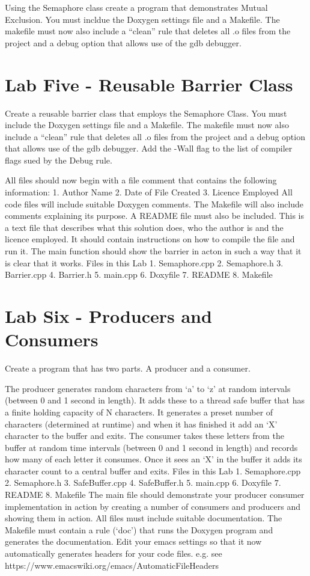 \documentclass[10pt,a4paper]{article}
\begin{document}
Using the Semaphore class create a program that demonstrates Mutual Exclusion. You must  incldue the Doxygen settings file and a Makefile.  The makefile must now also include a “clean” rule that deletes all .o files from the project and a debug option that allows use of the gdb debugger.  

 \section{Lab Five - Reusable Barrier Class}

Create a reusable barrier class that employs the Semaphore Class. You must  include the Doxygen settings file and a Makefile.
The makefile must now also include a “clean” rule that deletes all .o files from the project and a debug option that allows use of the gdb debugger. Add the -Wall flag to the list of compiler flags sued by the Debug rule. 

All files should now begin with a file comment that contains the following information:
    1. Author Name
    2. Date of File Created
    3. Licence Employed
All code files will include suitable Doxygen comments.  The Makefile will also include comments explaining its purpose.
A README file must also be included.  This is a text file that describes what this solution does, who the author is and the licence employed.  It should contain instructions on how to compile the file and run it.
The main function should show the barrier in acton in such a way that it is clear that it works.
Files in this Lab
    1. Semaphore.cpp
    2. Semaphore.h
    3. Barrier.cpp
    4. Barrier.h
    5. main.cpp
    6. Doxyfile
    7. README
    8. Makefile

 \section{Lab Six - Producers and Consumers}
 
 
 Create a program that has two parts.  A producer and a consumer.

The producer generates random characters from ‘a’ to ‘z’ at random intervals (between 0 and 1 second in length). It adds these to a thread safe buffer that has a finite holding capacity of N characters. It generates a preset number of characters (determined at runtime) and when it has finished it add an ‘X’ character to the buffer and exits.
The consumer takes these letters from the buffer at random time intervals (between 0 and 1 second in length) and records how many of each letter it consumes. Once it sees an ‘X’ in the buffer it adds its character count to a central buffer and exits.
Files in this Lab
    1. Semaphore.cpp
    2. Semaphore.h
    3. SafeBuffer.cpp
    4. SafeBuffer.h
    5. main.cpp
    6. Doxyfile
    7. README
    8. Makefile
The main file should demonstrate your producer consumer implementation in action by creating a  number of consumers and producers and showing them in action.
All files must include suitable documentation. The Makefile must contain a rule (‘doc’) that runs the Doxygen program and generates the documentation.
Edit your emacs settings so that it now automatically generates headers for your code files.  e.g. see https://www.emacswiki.org/emacs/AutomaticFileHeaders
\end{document}
